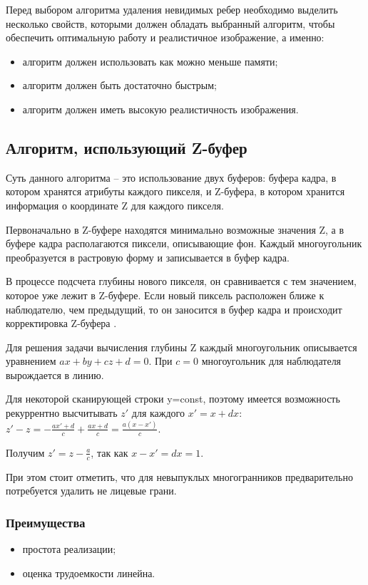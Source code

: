 Перед выбором алгоритма удаления невидимых ребер необходимо выделить несколько свойств, которыми должен обладать выбранный алгоритм, чтобы обеспечить оптимальную работу и реалистичное изображение, а именно:
\begin{itemize}
\item	алгоритм должен использовать как можно меньше памяти;
\item	алгоритм должен быть достаточно быстрым;
\item	алгоритм должен иметь высокую реалистичность изображения.
\end{itemize}

\subsection{Алгоритм, использующий Z-буфер}
Суть данного алгоритма – это использование двух буферов: буфера кадра, в котором хранятся атрибуты каждого пикселя, и Z-буфера, в котором хранится информация о координате Z для каждого пикселя.

Первоначально в Z-буфере находятся минимально возможные значения Z, а в буфере кадра располагаются пиксели, описывающие фон. Каждый многоугольник преобразуется в растровую форму и записывается в буфер кадра.

В процессе подсчета глубины нового пикселя, он сравнивается с тем значением, которое уже лежит в Z-буфере. Если новый пиксель расположен ближе к наблюдателю, чем предыдущий, то он заносится в буфер кадра и происходит корректировка Z-буфера \cite{zbufer}.

Для решения задачи вычисления глубины Z каждый многоугольник описывается уравнением $ax+by+cz+d=0$. При $c=0$ многоугольник для наблюдателя вырождается в линию. 

Для некоторой сканирующей строки y=const, поэтому имеется возможность рекуррентно высчитывать $z'$ для каждого $x'=x+dx$: $z' - z = - \frac{ax' + d}{c} + \frac{ax + d}{c} = \frac{a(x - x')}{c}$.

Получим $z' = z - \frac{a}{c}$, так как $x - x' = dx = 1$.

При этом стоит отметить, что для невыпуклых многогранников предварительно потребуется удалить не лицевые грани.

\subsubsection*{Преимущества}
\begin{itemize}
	\item простота реализации;
	\item оценка трудоемкости линейна.
\end{itemize}
